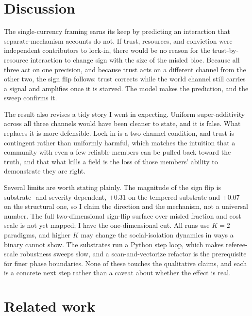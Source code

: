 \documentclass[11pt]{article}
\begin{document}
\section{Discussion}
\label{sec:discussion}

The single-currency framing earns its keep by predicting an interaction that
separate-mechanism accounts do not. If trust, resources, and conviction were
independent contributors to lock-in, there would be no reason for the
trust-by-resource interaction to change sign with the size of the misled bloc.
Because all three act on one precision, and because trust acts on a different
channel from the other two, the sign flip follows: trust corrects while the
world channel still carries a signal and amplifies once it is starved. The model
makes the prediction, and the sweep confirms it.

The result also revises a tidy story I went in expecting. Uniform
super-additivity across all three channels would have been cleaner to state, and
it is false. What replaces it is more defensible. Lock-in is a two-channel
condition, and trust is contingent rather than uniformly harmful, which matches
the intuition that a community with even a few reliable members can be pulled
back toward the truth, and that what kills a field is the loss of those members'
ability to demonstrate they are right.

Several limits are worth stating plainly. The magnitude of the sign flip is
substrate- and severity-dependent, $+0.31$ on the tempered substrate and $+0.07$
on the structural one, so I claim the direction and the mechanism, not a
universal number. The full two-dimensional sign-flip surface over misled
fraction and cost scale is not yet mapped; I have the one-dimensional cut. All
runs use $K=2$ paradigms, and higher $K$ may change the social-isolation
dynamics in ways a binary cannot show. The substrates run a Python step loop,
which makes referee-scale robustness sweeps slow, and a scan-and-vectorize
refactor is the prerequisite for finer phase boundaries. None of these touches
the qualitative claims, and each is a concrete next step rather than a caveat
about whether the effect is real.

\section{Related work}
\label{sec:related}
\end{document}
